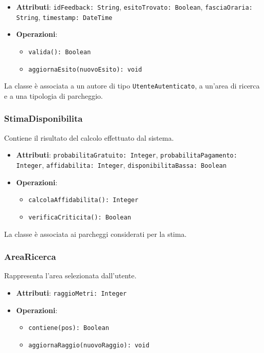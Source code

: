 \documentclass[12pt,a4paper]{article}
\begin{document}
\begin{itemize}
    \item \textbf{Attributi}: \texttt{idFeedback: String}, \texttt{esitoTrovato: Boolean}, \texttt{fasciaOraria: String}, \texttt{timestamp: DateTime}
    \item \textbf{Operazioni}:
    \begin{itemize}
        \item \texttt{valida(): Boolean}
        \item \texttt{aggiornaEsito(nuovoEsito): void}
    \end{itemize}
\end{itemize}

La classe è associata a un autore di tipo \texttt{UtenteAutenticato}, a un’area di ricerca e a una tipologia di parcheggio.

\subsubsection{StimaDisponibilita}
Contiene il risultato del calcolo effettuato dal sistema.

\begin{itemize}
    \item \textbf{Attributi}: \texttt{probabilitaGratuito: Integer}, \texttt{probabilitaPagamento: Integer}, \texttt{affidabilita: Integer}, \texttt{disponibilitaBassa: Boolean}
    \item \textbf{Operazioni}:
    \begin{itemize}
        \item \texttt{calcolaAffidabilita(): Integer}
        \item \texttt{verificaCriticita(): Boolean}
    \end{itemize}
\end{itemize}

La classe è associata ai parcheggi considerati per la stima.

\subsubsection{AreaRicerca}
Rappresenta l’area selezionata dall’utente.

\begin{itemize}
    \item \textbf{Attributi}: \texttt{raggioMetri: Integer}
    \item \textbf{Operazioni}:
    \begin{itemize}
        \item \texttt{contiene(pos): Boolean}
        \item \texttt{aggiornaRaggio(nuovoRaggio): void}
    \end{itemize}
\end{itemize}
\end{document}
